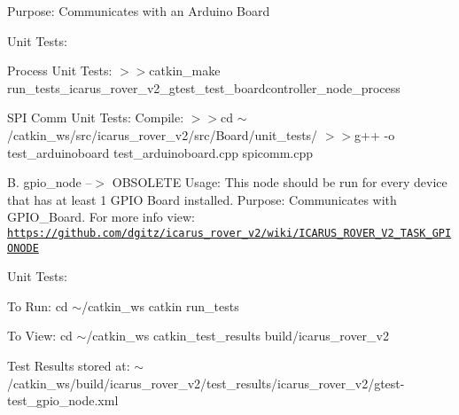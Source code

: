 Purpose\+: Communicates with an Arduino Board

Unit Tests\+:
\begin{DoxyEnumerate}
\item Process Unit Tests\+: $>$$>$catkin\+\_\+make run\+\_\+tests\+\_\+icarus\+\_\+rover\+\_\+v2\+\_\+gtest\+\_\+test\+\_\+boardcontroller\+\_\+node\+\_\+process
\item S\+PI Comm Unit Tests\+: Compile\+: $>$$>$cd $\sim$/catkin\+\_\+ws/src/icarus\+\_\+rover\+\_\+v2/src/\+Board/unit\+\_\+tests/ $>$$>$g++ -\/o test\+\_\+arduinoboard test\+\_\+arduinoboard.\+cpp spicomm.\+cpp
\end{DoxyEnumerate}

B. gpio\+\_\+node --$>$ O\+B\+S\+O\+L\+E\+TE Usage\+: This node should be run for every device that has at least 1 G\+P\+IO Board installed. Purpose\+: Communicates with G\+P\+I\+O\+\_\+\+Board. For more info view\+: \href{https://github.com/dgitz/icarus_rover_v2/wiki/ICARUS_ROVER_V2_TASK_GPIONODE}{\tt https\+://github.\+com/dgitz/icarus\+\_\+rover\+\_\+v2/wiki/\+I\+C\+A\+R\+U\+S\+\_\+\+R\+O\+V\+E\+R\+\_\+\+V2\+\_\+\+T\+A\+S\+K\+\_\+\+G\+P\+I\+O\+N\+O\+DE}

Unit Tests\+:
\begin{DoxyEnumerate}
\item To Run\+: cd $\sim$/catkin\+\_\+ws catkin run\+\_\+tests
\item To View\+: cd $\sim$/catkin\+\_\+ws catkin\+\_\+test\+\_\+results build/icarus\+\_\+rover\+\_\+v2
\end{DoxyEnumerate}

Test Results stored at\+: $\sim$/catkin\+\_\+ws/build/icarus\+\_\+rover\+\_\+v2/test\+\_\+results/icarus\+\_\+rover\+\_\+v2/gtest-\/test\+\_\+gpio\+\_\+node.xml 